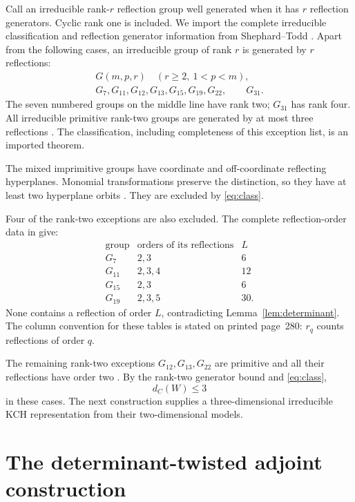 \documentclass[11pt]{article}
\begin{document}
Call an irreducible rank-$r$ reflection group well generated when
it has $r$ reflection generators. Cyclic rank one is included.
We import the complete irreducible classification and reflection
generator information from Shephard--Todd
\cite[Table~VII and its footnote, printed p.~301]{st54}.
Apart from the following cases, an irreducible group of rank $r$
is generated by $r$ reflections:
\[
 \begin{gathered}
 G(m,p,r)\quad(r\ge2,\ 1<p<m),\\
 G_7,G_{11},G_{12},G_{13},G_{15},G_{19},G_{22},\qquad G_{31}.
 \end{gathered}
\]
The seven numbered groups on the middle line have rank two;
$G_{31}$ has rank four.
All irreducible primitive rank-two groups are generated by at most
three reflections \cite[Section~4, printed p.~280]{st54}.
The classification, including completeness of this exception list,
is an imported theorem.

The mixed imprimitive groups have coordinate and off-coordinate
reflecting hyperplanes. Monomial transformations preserve the
distinction, so they have at least two hyperplane orbits
\cite[Section~2, printed pp.~276--277]{st54}.
They are excluded by \eqref{eq:class}.

Four of the rank-two exceptions are also excluded.
The complete reflection-order data in
\cite[Tables~I--III, printed pp.~281--282]{st54} give:
\[
\begin{array}{c|c|c}
 \text{group}&\text{orders of its reflections}&L\\\hline
 G_7&2,3&6\\
 G_{11}&2,3,4&12\\
 G_{15}&2,3&6\\
 G_{19}&2,3,5&30 .
\end{array}
\]
None contains a reflection of order $L$, contradicting
Lemma~\ref{lem:determinant}. The column convention for these tables
is stated on printed page~280: $r_q$ counts reflections of order $q$.

The remaining rank-two exceptions $G_{12},G_{13},G_{22}$ are
primitive and all their reflections have order two
\cite[Section~4 and Tables~II--III, printed pp.~279--282]{st54}.
By the rank-two generator bound and \eqref{eq:class},
\[
                         d_C(W)\le3
\]
in these cases. The next construction supplies a three-dimensional
irreducible KCH representation from their two-dimensional models.

\section{The determinant-twisted adjoint construction}
\end{document}
